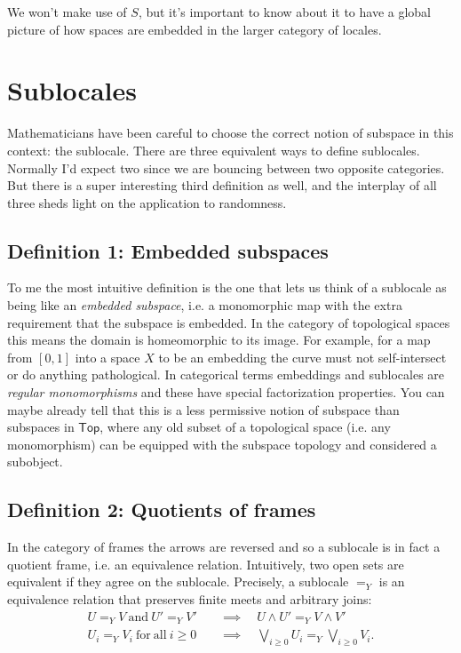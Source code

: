 \documentclass[14pt]{extarticle}
\newcommand{\Topcat}{\ensuremath{\mathsf{Top}}}
\begin{document}
We won't make use of $S$, but it's important to know about it to have a global picture of how spaces are embedded in the larger category of locales.

\section{Sublocales}

Mathematicians have been careful to choose the correct notion of subspace in this context: the sublocale. There are three equivalent ways to define sublocales. Normally I'd expect two since we are bouncing between two opposite categories. But there is a super interesting third definition as well, and the interplay of all three sheds light on the application to randomness.

\subsection{Definition 1: Embedded subspaces}
To me the most intuitive definition is the one that lets us think of a sublocale as being like an \emph{embedded subspace}, i.e. a monomorphic map with the extra requirement that the subspace is embedded. In the category of topological spaces this means the domain is homeomorphic to its image. For example, for a map from $[0,1]$ into a space $X$ to be an embedding the curve must not self-intersect or do anything pathological. In categorical terms embeddings and sublocales are \emph{regular monomorphisms} and these have special factorization properties. You can maybe already tell that this is a less permissive notion of subspace than subspaces in \Topcat, where any old subset of a topological space (i.e. any monomorphism) can be equipped with the subspace topology and considered a subobject.

\subsection{Definition 2: Quotients of frames}
In the category of frames the arrows are reversed and so a sublocale is in fact a quotient frame, i.e. an equivalence relation. Intuitively, two open sets are equivalent if they agree on the sublocale. Precisely, a sublocale $=_Y$ is an equivalence relation that preserves finite meets and arbitrary joins:
\begin{align*}
U=_Y V\mathrm{\ and\ }U'=_Y V'&\quad\implies\quad U\wedge U'=_Y V\wedge V' \\
U_i=_Y V_i\mathrm{\ for\ all\ } i\geq 0&\quad\implies\quad \bigvee_{i\geq 0}U_i =_Y \bigvee_{i\geq 0} V_i.
\end{align*}
\end{document}
